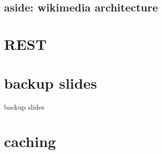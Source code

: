\subsection{aside: wikimedia architecture}


\section{REST}




\section{backup slides}
\begin{frame}{backup slides}
\end{frame}
\section{caching}



